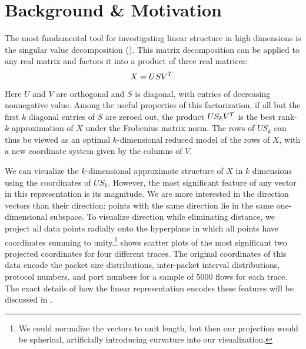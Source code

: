 \documentclass[conference]{IEEEtran}
\begin{document}

\section{Background \& Motivation}

The most fundamental tool for investigating linear structure in high dimensions is the singular value decomposition ().
This matrix decomposition can be applied to any real matrix and factors it into a product of three real matrices:
\begin{align}
  X = US{V}^T.
\end{align}
Here $U$ and $V$ are orthogonal and $S$ is diagonal, with entries of decreasing nonnegative value.
Among the useful properties of this factorization, if all but the first $k$ diagonal entries of $S$ are zeroed out, the product $US_k{V}^T$ is the best rank-$k$ approximation of $X$ under the Frobenius matrix norm.
The rows of $US_k$ can thus be viewed as an optimal $k$-dimensional reduced model of the rows of $X$, with a new coordinate system given by the columns of $V$.

We can visualize the $k$-dimensional approximate structure of $X$ in $k$ dimensions using the coordinates of $US_k$.
However, the most significant feature of any vector in this representation is its magnitude.
We are more interested in the direction vectors than their direction:
points with the same direction lie in the same one-dimensional subspace.
To visualize direction while eliminating distance, we project all data points radially onto the hyperplane in which all points have coordinates summing to unity.\footnote{We could normalize the vectors to unit length, but then our projection would be spherical, artificially introducing curvature into our visualization.}
 shows scatter plots of the most significant two projected  coordinates for four different traces.
The original coordinates of this data encode the packet size distributions, inter-packet interval distributions,  protocol numbers, and port numbers for a sample of 5000 flows for each trace.
The exact details of how the linear representation encodes these features will be discussed in .
\end{document}
